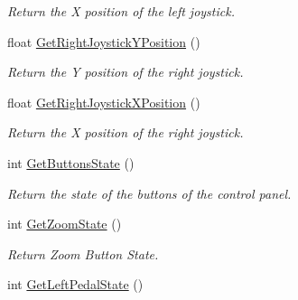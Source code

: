 \begin{DoxyCompactItemize}
\begin{DoxyCompactList}\small\item\em Return the X position of the left joystick. \item\end{DoxyCompactList}\item 
\hypertarget{classvtkVSP_af0900941205cbf30865951fed08c90d8}{
float \hyperlink{classvtkVSP_af0900941205cbf30865951fed08c90d8}{GetRightJoystickYPosition} ()}
\label{classvtkVSP_af0900941205cbf30865951fed08c90d8}

\begin{DoxyCompactList}\small\item\em Return the Y position of the right joystick. \item\end{DoxyCompactList}\item 
\hypertarget{classvtkVSP_ab338cddba4dd2a4f12a5859d0475da26}{
float \hyperlink{classvtkVSP_ab338cddba4dd2a4f12a5859d0475da26}{GetRightJoystickXPosition} ()}
\label{classvtkVSP_ab338cddba4dd2a4f12a5859d0475da26}

\begin{DoxyCompactList}\small\item\em Return the X position of the right joystick. \item\end{DoxyCompactList}\item 
\hypertarget{classvtkVSP_a659a26e683c6084077de26cebc592d0f}{
int \hyperlink{classvtkVSP_a659a26e683c6084077de26cebc592d0f}{GetButtonsState} ()}
\label{classvtkVSP_a659a26e683c6084077de26cebc592d0f}

\begin{DoxyCompactList}\small\item\em Return the state of the buttons of the control panel. \item\end{DoxyCompactList}\item 
\hypertarget{classvtkVSP_acfd028901c1201d7f6683302f729866e}{
int \hyperlink{classvtkVSP_acfd028901c1201d7f6683302f729866e}{GetZoomState} ()}
\label{classvtkVSP_acfd028901c1201d7f6683302f729866e}

\begin{DoxyCompactList}\small\item\em Return Zoom Button State. \item\end{DoxyCompactList}\item 
\hypertarget{classvtkVSP_ae86717a441882e461ae6589ce9132488}{
int \hyperlink{classvtkVSP_ae86717a441882e461ae6589ce9132488}{GetLeftPedalState} ()}
\label{classvtkVSP_ae86717a441882e461ae6589ce9132488}


\end{DoxyCompactItemize}
